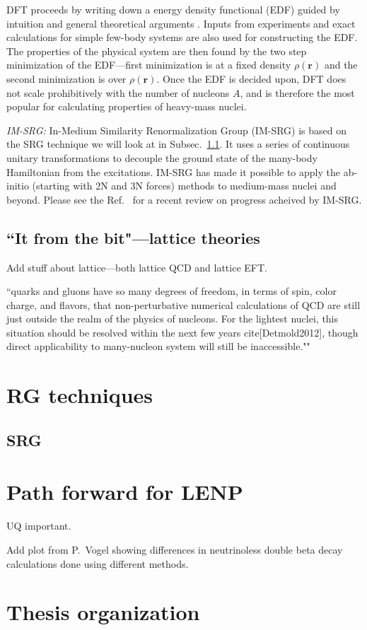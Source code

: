 	DFT proceeds by writing down a energy density functional (EDF) guided by
	intuition and general theoretical arguments
	\cite{Drut:2009ce, Dobaczewski:2010gr}.  Inputs from experiments
	and exact calculations for simple few-body systems are also used for
	constructing the EDF.  The properties of the physical system are then found
	by the two step minimization of the EDF---first minimization is at a fixed
	density $\rho(\bm{r})$ and the second minimization is over $\rho(\bm{r})$.
	Once the EDF is decided upon, DFT does not scale prohibitively with
	the number of nucleons $A$, and is therefore the most popular for
	calculating properties of heavy-mass nuclei.

	\li
	\emph{IM-SRG:} In-Medium Similarity Renormalization Group (IM-SRG) is
	based on the SRG technique we will look at in Subsec.~\ref{subsec:SRG_intro}.
	It uses a series of continuous unitary transformations to decouple
	the ground state of the many-body Hamiltonian from the excitations.
	IM-SRG has made it possible to apply the ab-initio (starting with 2N and
	3N forces) methods to medium-mass nuclei and beyond.  Please see the
	Ref.~\cite{Hergert:2015awm} for a recent review on progress acheived by
	IM-SRG.  
	\ei

	\subsection{``It from the bit"---lattice theories}
	\label{sec:lattice_QCD}

	Add stuff about lattice---both lattice QCD and lattice EFT.

	``quarks and gluons have so many degrees of freedom, in terms of spin,
	color charge, and flavors, that non-perturbative numerical calculations of
	QCD are still just outside the realm of the physics of nucleons. For the
	lightest nuclei, this situation should be resolved within the next few years
	cite[Detmold2012], though direct applicability to many-nucleon system will
	still be inaccessible.""

	\section{RG techniques}

	\subsection{SRG}
	\label{subsec:SRG_intro}



	\section{Path forward for LENP}

	UQ important.

	Add plot from P.\ Vogel showing differences in neutrinoless double beta decay
	calculations done using different methods.

	\section{Thesis organization}
